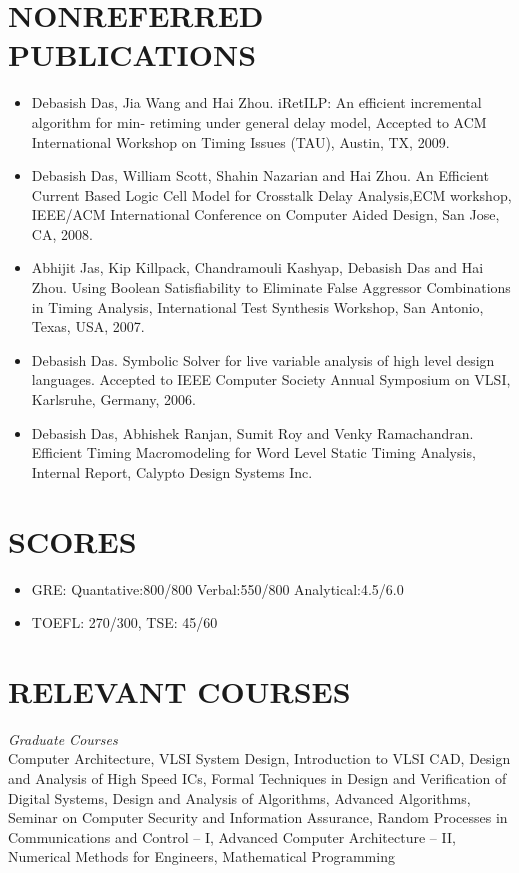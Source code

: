 \documentclass[margin]{res}
\begin{document}
\begin{resume}
\section{NONREFERRED PUBLICATIONS}
\begin{itemize} \itemsep -2pt
\item Debasish Das, Jia Wang and Hai Zhou. iRetILP: An efficient incremental algorithm for min-  retiming under general delay model, Accepted to ACM International Workshop on Timing Issues (TAU), 
  Austin, TX, 2009.
\item Debasish Das, William Scott, Shahin Nazarian and Hai Zhou. An Efficient Current Based Logic Cell
Model for Crosstalk Delay Analysis,ECM workshop, IEEE/ACM International Conference on Computer Aided Design,
San Jose, CA, 2008.
\item Abhijit Jas, Kip Killpack, Chandramouli Kashyap, Debasish Das and Hai Zhou. Using Boolean Satisfiability
  to Eliminate False Aggressor Combinations in Timing Analysis, International Test Synthesis Workshop, 
  San Antonio, Texas, USA, 2007.
\item Debasish Das. Symbolic Solver for live variable analysis of high level design languages. Accepted to 
  IEEE Computer Society Annual Symposium on VLSI, Karlsruhe, Germany, 2006.
\item Debasish Das, Abhishek Ranjan, Sumit Roy and Venky Ramachandran. Efficient Timing Macromodeling for 
  Word Level Static Timing Analysis, Internal Report, Calypto Design Systems Inc.
\end{itemize}

\section{SCORES} 
\begin{itemize} \itemsep -2pt
\item GRE: Quantative:800/800 Verbal:550/800 Analytical:4.5/6.0
\item TOEFL: 270/300, TSE: 45/60
\end{itemize}

\section{RELEVANT COURSES} {\sl Graduate Courses} \\
Computer Architecture, VLSI System Design, Introduction to VLSI CAD, 
Design and Analysis of High Speed ICs, Formal Techniques in Design 
and Verification of Digital Systems, Design and Analysis of Algorithms, 
Advanced Algorithms, Seminar on Computer Security and Information Assurance, 
Random Processes in Communications and Control – I, Advanced Computer 
Architecture – II, Numerical Methods for Engineers, Mathematical Programming\\


\end{resume}
\end{document}
